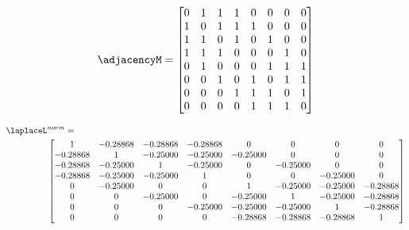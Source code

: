 \begin{equation}
\adjacencyM =
\begin{bmatrix}
0 & 1 & 1 & 1 & 0 & 0 & 0 & 0 \\
1 & 0 & 1 & 1 & 1 & 0 & 0 & 0 \\
1 & 1 & 0 & 1 & 0 & 1 & 0 & 0 \\
1 & 1 & 1 & 0 & 0 & 0 & 1 & 0 \\
0 & 1 & 0 & 0 & 0 & 1 & 1 & 1 \\
0 & 0 & 1 & 0 & 1 & 0 & 1 & 1 \\
0 & 0 & 0 & 1 & 1 & 1 & 0 & 1 \\
0 & 0 & 0 & 0 & 1 & 1 & 1 & 0
\end{bmatrix}
\end{equation}

\begin{align}
\laplaceL&^{norm} = \nonumber\\
&\begin{bmatrix}
1 & -0.28868 & -0.28868 & -0.28868 & 0 & 0 & 0 & 0 \\
-0.28868 &  1 & -0.25000 & -0.25000 & -0.25000 & 0 & 0 & 0 \\
-0.28868 & -0.25000 &  1 & -0.25000 & 0 & -0.25000 & 0 & 0 \\
-0.28868 & -0.25000 & -0.25000 &  1 & 0 & 0 & -0.25000 & 0 \\
0 & -0.25000 & 0 & 0 &  1 & -0.25000 & -0.25000 & -0.28868 \\
0 & 0 & -0.25000 & 0 & -0.25000 &  1 & -0.25000 & -0.28868 \\
0 & 0 & 0 & -0.25000 & -0.25000 & -0.25000 &  1 & -0.28868 \\
0 & 0 & 0 & 0 & -0.28868 & -0.28868 & -0.28868 &  1
\end{bmatrix}
\end{align}
